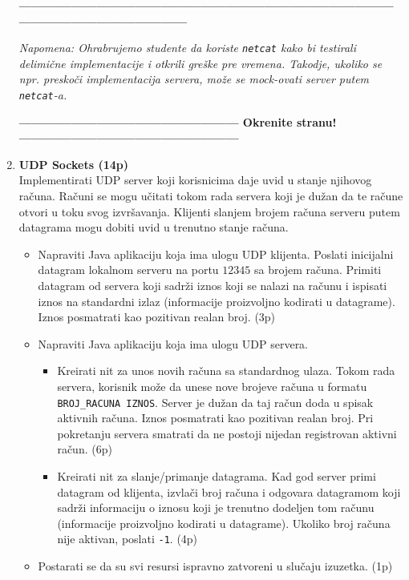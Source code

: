 \documentclass[]{article}
\begin{document}
\begin{enumerate}
\vspace{20pt}
\begin{center}
  \textbf{------------------------------------------------------------------------------------------------------------------------------}
\end{center}
\textit{Napomena: Ohrabrujemo studente da koriste \texttt{netcat} kako bi testirali delimi\v{c}ne implementacije i otkrili gre\v{s}ke pre vremena. Takodje, ukoliko se npr. presko\v{c}i implementacija servera, mo\v{z}e se mock-ovati server putem \texttt{netcat}-a.} 
\begin{center}
  \textbf{--------------------------------------------------- Okrenite stranu! ---------------------------------------------------}
\end{center}
\newpage

\item \textbf{UDP Sockets (14p)}
    \\Implementirati UDP server koji korisnicima daje uvid u stanje njihovog ra\v{c}una. Ra\v{c}uni se mogu u\v{c}itati tokom rada servera koji je du\v{z}an da te ra\v{c}une otvori u toku svog izvr\v{s}avanja. Klijenti slanjem brojem ra\v{c}una serveru putem datagrama mogu dobiti uvid u trenutno stanje ra\v{c}una.
\begin{itemize}
  \item Napraviti Java aplikaciju koja ima ulogu UDP klijenta. Poslati inicijalni datagram lokalnom serveru na portu $12345$ sa brojem ra\v{c}una. Primiti datagram od servera koji sadr\v{z}i iznos koji se nalazi na ra\v{c}unu i ispisati iznos na standardni izlaz (informacije proizvoljno kodirati u datagrame). Iznos posmatrati kao pozitivan realan broj. \hfill (3p)
  \item Napraviti Java aplikaciju koja ima ulogu UDP servera.
    \begin{itemize}
      \item Kreirati nit za unos novih ra\v{c}una sa standardnog ulaza. Tokom rada servera, korisnik mo\v{z}e da unese nove brojeve ra\v{c}una u formatu \texttt{BROJ\_RACUNA IZNOS}. Server je du\v{z}an da taj ra\v{c}un doda u spisak aktivnih ra\v{c}una. Iznos posmatrati kao pozitivan realan broj. Pri pokretanju servera smatrati da ne postoji nijedan registrovan aktivni ra\v{c}un. \hfill (6p)
      \item Kreirati nit za slanje/primanje datagrama. Kad god server primi datagram od klijenta, izvla\v{c}i broj ra\v{c}una i odgovara datagramom koji sadr\v{z}i informaciju o iznosu koji je trenutno dodeljen tom ra\v{c}unu (informacije proizvoljno kodirati u datagrame). Ukoliko broj ra\v{c}una nije aktivan, poslati \texttt{-1}. \hfill (4p)
    \end{itemize}
  \item Postarati se da su svi resursi ispravno zatvoreni u slu\v{c}aju izuzetka. \hfill (1p)
\end{itemize}

\end{enumerate}
\end{document}
